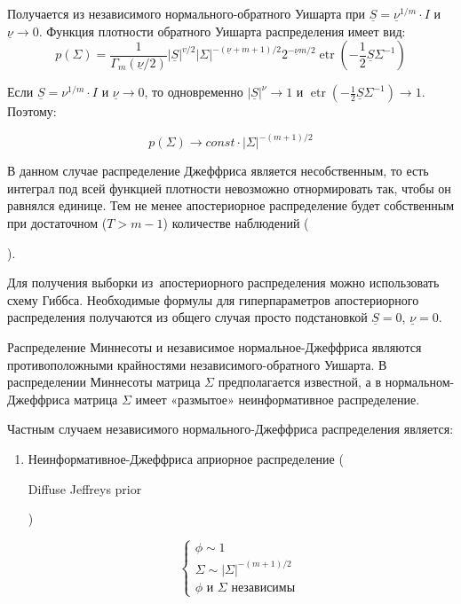 \documentclass[11pt]{article} %
\DeclareMathOperator{\etr}{etr}
\newcommand{\prior}{\underline}
\newcommand{\eng}[1]{\begin{otherlanguage}{english}#1\end{otherlanguage}}
\begin{document}
\begin{enumerate}
\begin{enumerate}
Получается из независимого нормального-обратного Уишарта при $\prior S
= \prior \nu^{1/m} \cdot I$ и  $\prior \nu \to 0$. Функция плотности обратного Уишарта распределения имеет вид:
\[
p(\Sigma) = \frac{1}{\Gamma_m(\prior\nu/2)}
|\prior S|^{v/2} |\Sigma|^{-(\prior\nu+m+1)/2}2^{-\prior\nu m/2}
\etr\left( -\frac{1}{2} \prior S\Sigma^{-1} \right)
\]

Если $\prior S= \nu^{1/m} \cdot I$ и $\prior \nu \to 0$, то одновременно $|\prior S|^{\nu} \to 1$ и $\etr\left( -\frac{1}{2} \prior S\Sigma^{-1} \right) \to 1$. Поэтому:

\[
p(\Sigma) \to const \cdot |\Sigma|^{-(m+1)/2}
\]


В данном случае распределение Джеффриса является несобственным, то есть интеграл под всей функцией плотности невозможно отнормировать так, чтобы он равнялся единице. Тем не менее апостериорное распределение будет собственным при достаточном ($T>m-1$) количестве наблюдений  (\eng{\cite{alvarez_2014}}).


Для получения выборки из~апостериорного распределения можно
использовать схему Гиббса. Необходимые формулы для гиперпараметров
апостериорного распределения получаются из общего случая просто
подстановкой $\prior S=0$, $\prior \nu =0$.

Распределение Миннесоты и независимое нормальное-Джеффриса являются
противоположными крайностями независимого-обратного Уишарта. В
распределении Миннесоты матрица $\Sigma$ предполагается известной, а в
нормальном-Джеффриса матрица $\Sigma$ имеет «размытое» неинформативное
распределение.



Частным случаем независимого нормального-Джеффриса распределения является:


\begin{enumerate}

\item Неинформативное-Джеффриса априорное распределение (\eng{Diffuse Jeffreys prior})

\begin{equation}
\begin{cases}
\phi \sim 1 \\
\Sigma \sim |\Sigma|^{-(m+1)/2} \\
\phi \text{ и } \Sigma \text{ независимы }
\end{cases}
\end{equation}

\end{enumerate}


\end{enumerate}
\end{enumerate}
\end{document}
